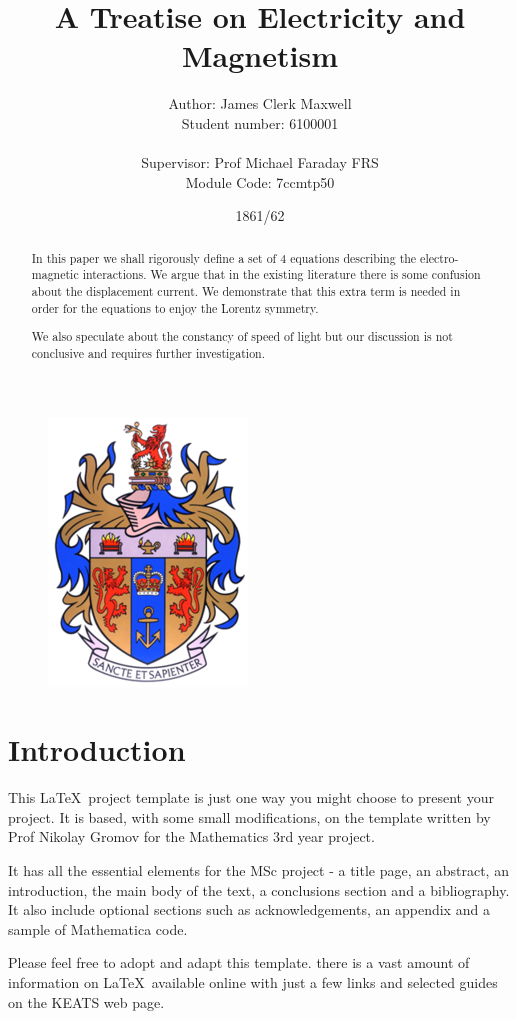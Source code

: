 \documentclass[a4paper,11pt]{article}
\title{A Treatise on Electricity and Magnetism}
\author{Author: James Clerk Maxwell \\
Student number: 6100001\\
\\ Supervisor: Prof Michael Faraday FRS \\ Module Code: 7ccmtp50}
\date{1861/62}
\numberwithin{equation}{section}
\theoremstyle{definition}
\begin{document}
\clearpage\maketitle
\thispagestyle{empty}
\begin{figure}[H]
    \centering
    \vspace{100mm}
    \includegraphics[width=0.2\columnwidth]{kcl_logo.png}
\end{figure}

\newpage

\begin{abstract}

In this paper we shall rigorously define a set of $4$ equations
describing the electro-magnetic interactions. We argue that in the
existing literature there is some confusion about the displacement
current. We demonstrate that this extra term is needed in order for
the equations to enjoy the Lorentz symmetry. 

We also speculate about the constancy of speed of light but our
discussion is not conclusive and requires further investigation. 

\end{abstract}
\newpage

\tableofcontents

\newpage
\section{Introduction}
\label{intro}

This \LaTeX\ project template is just one way you might choose to
present your project. It is based, with some small modifications, on
the template written by Prof Nikolay Gromov for the Mathematics 3rd year
project. 

It has all the essential elements for the MSc project - a title page, an
abstract, an introduction, the main body of the text, a conclusions
section and a bibliography. 
It also include optional sections such as acknowledgements, an
appendix and a sample of Mathematica code. 

Please feel free to adopt and adapt this template. there is a vast
amount of information on \LaTeX\ available online with just a few
links and selected guides on the KEATS web page.
\end{document}
